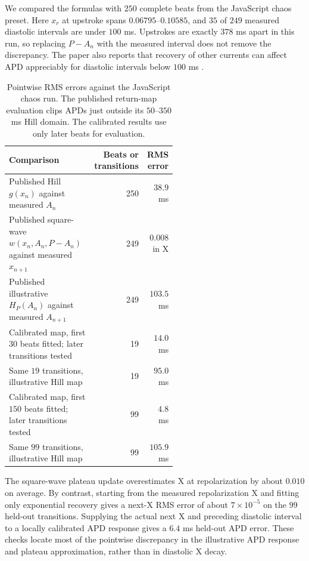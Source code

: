 \documentclass[11pt]{article}
\begin{document}
We compared the formulas with $250$ complete beats from the JavaScript chaos preset. Here $x_r$ at upstroke spans $0.06795$--$0.10585$, and $35$ of $249$ measured diastolic intervals are under $100$ ms. Upstrokes are exactly $378$ ms apart in this run, so replacing $P-A_n$ with the measured interval does not remove the discrepancy. The paper also reports that recovery of other currents can affect APD appreciably for diastolic intervals below $100$ ms \cite{landaw2018}.

\begin{table}[H]
\centering
\caption{Pointwise RMS errors against the JavaScript chaos run. The published return-map evaluation clips APDs just outside its $50$--$350$ ms Hill domain. The calibrated results use only later beats for evaluation.}
\begin{tabular}{p{0.56\linewidth}rr}
\toprule
Comparison & Beats or transitions & RMS error \\
\midrule
Published Hill $g(x_n)$ against measured $A_n$ & 250 & $38.9$ ms \\
Published square-wave $w(x_n,A_n,P-A_n)$ against measured $x_{n+1}$ & 249 & $0.008$ in X \\
Published illustrative $H_P(A_n)$ against measured $A_{n+1}$ & 249 & $103.5$ ms \\
Calibrated map, first $30$ beats fitted; later transitions tested & 19 & $14.0$ ms \\
Same $19$ transitions, illustrative Hill map & 19 & $95.0$ ms \\
Calibrated map, first $150$ beats fitted; later transitions tested & 99 & $4.8$ ms \\
Same $99$ transitions, illustrative Hill map & 99 & $105.9$ ms \\
\bottomrule
\end{tabular}
\end{table}

The square-wave plateau update overestimates X at repolarization by about $0.010$ on average. By contrast, starting from the measured repolarization X and fitting only exponential recovery gives a next-X RMS error of about $7\times10^{-5}$ on the $99$ held-out transitions. Supplying the actual next X and preceding diastolic interval to a locally calibrated APD response gives a $6.4$ ms held-out APD error. These checks locate most of the pointwise discrepancy in the illustrative APD response and plateau approximation, rather than in diastolic X decay.
\end{document}
